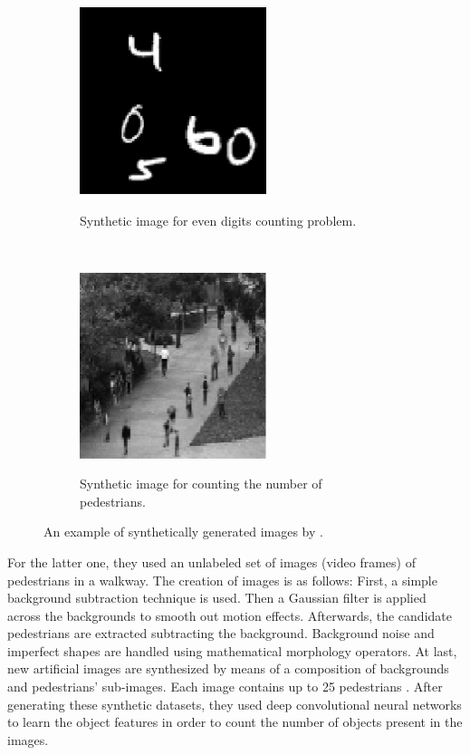 \begin{figure}[h!]
    \centering
    \begin{subfigure}[t]{0.5\textwidth}
        \centering
        {\includegraphics[width=0.6\textwidth]{images/digdigdig}}
        \caption{Synthetic image for even digits counting problem.}
    \end{subfigure}%
    ~ 
    \begin{subfigure}[t]{0.5\textwidth}
        \centering
        {\includegraphics[width=0.6\textwidth]{images/pedpedped}}
        \caption{Synthetic image for counting the number of pedestrians.}
    \end{subfigure}
    \caption{An example of synthetically generated images by \citet*{segui2015learning}.}
    \label{digped}
\end{figure}

For the latter one, they used an unlabeled set of images (video frames) of pedestrians in a walkway. The creation of images is as follows: First, a simple background subtraction technique is used. Then a Gaussian filter is applied across the backgrounds to smooth out motion effects. Afterwards, the candidate pedestrians are extracted subtracting the background. Background noise and imperfect shapes are handled using mathematical morphology operators. At last, new artificial images are synthesized by means of a composition of backgrounds and pedestrians' sub-images. Each image contains up to 25 pedestrians \cite{segui2015learning}. After generating these synthetic datasets, they used deep convolutional neural networks to learn the object features in order to count the number of objects present in the images.     
  
